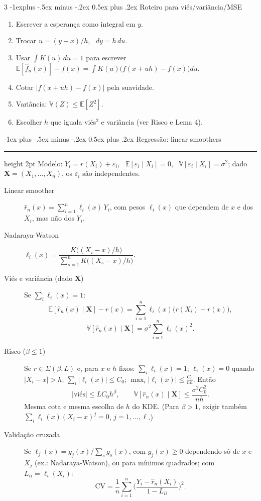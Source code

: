 \documentclass[10pt,landscape]{article}
\makeatletter
\newcommand{\E}{\mathbb{E}}
\newcommand{\V}{\mathbb{V}}
\newcommand{\CV}{\textrm{CV}}
\newcommand{\X}{\mathbf{X}}
\renewcommand{\section}{\@startsection{section}{1}{0mm}%
                                {-1ex plus -.5ex minus -.2ex}%
                                {0.5ex plus .2ex}%
                                {\normalfont\small\bfseries}}
\renewcommand{\subsection}{\@startsection{subsection}{2}{0mm}%
                                {-1explus -.5ex minus -.2ex}%
                                {0.5ex plus .2ex}%
                                {\normalfont\footnotesize\bfseries}}
\newcommand{\secrule}{\smallskip \hrule height 2pt \smallskip}
\makeatother
\begin{document}
\begin{multicols}{3}
\subsection{Roteiro para viés/variância/MSE}
\begin{enumerate}[leftmargin=10pt,itemsep=0pt,topsep=1pt]
  \item Escrever a esperança como integral em $y$.
  \item Trocar $u=(y-x)/h$, \ $dy=h\,du$.
  \item Usar $\int K(u)\,du=1$ para escrever $\E[\hat f_n(x)]-f(x)=\int K(u)\big(f(x+uh)-f(x)\big)du$.
  \item Cotar $|f(x+uh)-f(x)|$ pela suavidade.
  \item Variância: $\V(Z)\le\E[Z^2]$.
  \item Escolher $h$ que iguala viés$^2$ e variância (ver Risco e Lema 4).
\end{enumerate}

\section{Regressão: linear smoothers}\secrule
Modelo: $Y_i=r(X_i)+\varepsilon_i$, \ $\E[\varepsilon_i\mid X_i]=0$, \ $\V[\varepsilon_i\mid X_i]=\sigma^2$; dado $\X=(X_1,\dots,X_n)$, os $\varepsilon_i$ são independentes.
\begin{description}
  \item[Linear smoother] $\hat r_n(x)=\sum_{i=1}^n\ell_i(x)\,Y_i$, com pesos $\ell_i(x)$ que dependem de $x$ e dos $X_i$, mas não dos $Y_i$.
  \item[Nadaraya-Watson] $\ell_i(x)=\dfrac{K\big((X_i-x)/h\big)}{\sum_{s=1}^nK\big((X_s-x)/h\big)}$.
  \item[Viés e variância (dado $\X$)] Se $\sum_i\ell_i(x)=1$:
  \[\E[\hat r_n(x)\mid\X]-r(x)=\sum_{i=1}^n\ell_i(x)\big(r(X_i)-r(x)\big),\]
  \[\V[\hat r_n(x)\mid\X]=\sigma^2\sum_{i=1}^n\ell_i(x)^2.\]
  \item[Risco ($\beta\le1$)] Se $r\in\Sigma(\beta,L)$ e, para $x$ e $h$ fixos: $\sum_i\ell_i(x)=1$; $\ell_i(x)=0$ quando $|X_i-x|>h$; $\sum_i|\ell_i(x)|\le C_0$; $\max_i|\ell_i(x)|\le\frac{C_0}{nh}$. Então
  \[|\textrm{viés}|\le LC_0h^\beta,\qquad \V[\hat r_n(x)\mid\X]\le\frac{\sigma^2C_0^2}{nh}.\]
  Mesma cota e mesma escolha de $h$ do KDE. (Para $\beta>1$, exigir também $\sum_i\ell_i(x)(X_i-x)^j=0$, $j=1,\dots,\ell$.)
  \item[Validação cruzada] Se $\ell_j(x)=g_j(x)/\sum_sg_s(x)$, com $g_j(x)\ge0$ dependendo só de $x$ e $X_j$ (ex.: Nadaraya-Watson), ou para mínimos quadrados; com $L_{ii}=\ell_i(X_i)$:
  \[\CV=\frac1n\sum_{i=1}^n\Big(\frac{Y_i-\hat r_n(X_i)}{1-L_{ii}}\Big)^2.\]
\end{description}

\end{multicols}
\end{document}

